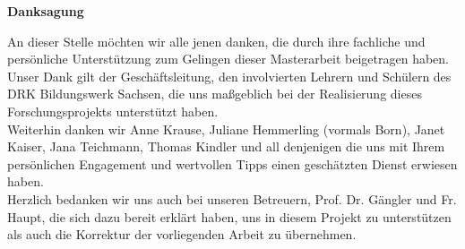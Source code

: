 \vspace*{\fill}
\begin{center}
\textbf{Danksagung}
\end{center}

\noindent 
An dieser Stelle möchten wir alle jenen danken, die durch ihre fachliche und persönliche Unterstützung zum Gelingen dieser Masterarbeit beigetragen haben.\\[0,5cm]
Unser Dank gilt der Geschäftsleitung, den involvierten Lehrern und Schülern des DRK Bildungswerk Sachsen, die uns maßgeblich bei der Realisierung dieses Forschungsprojekts unterstützt haben.\\[0,5cm]
Weiterhin danken wir Anne Krause, Juliane Hemmerling (vormals Born), Janet Kaiser, Jana Teichmann, Thomas Kindler und all denjenigen die uns mit Ihrem persönlichen Engagement und wertvollen Tipps einen geschätzten Dienst erwiesen haben.\\[0,5cm]
Herzlich bedanken wir uns auch bei unseren Betreuern, Prof. Dr. Gängler und Fr. Haupt, die sich dazu bereit erklärt haben, uns in diesem Projekt zu unterstützen als auch die Korrektur der vorliegenden Arbeit zu übernehmen.
\vspace{\fill}